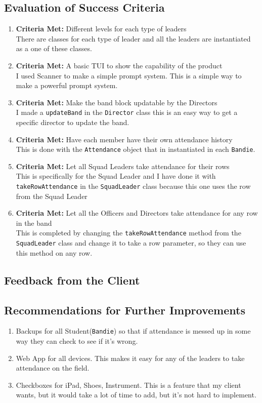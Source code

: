 \documentclass{article}
\begin{document}
\subsection{Evaluation of Success Criteria}
\begin{enumerate}
	\item \textbf{Criteria Met:} Different levels for each type of leaders \\
		There are classes for each type of leader and all the leaders are instantiated as a one of these classes.
	\item \textbf{Criteria Met:} A basic TUI to show the capability of the product\\
		I used Scanner to make a simple prompt system. This is a simple way to make a powerful prompt system.
	\item \textbf{Criteria Met:} Make the band block updatable by the Directors\\
		I made a \verb|updateBand| in the \verb|Director| class this is an easy way to get a specific director to update the band.
	\item \textbf{Criteria Met:} Have each member have their own attendance history\\
		This is done with the \verb|Attendance| object that in instantiated in each \verb|Bandie|.
	\item \textbf{Criteria Met:} Let all Squad Leaders take attendance for their rows\\
		This is specifically for the Squad Leader and I have done it with \verb|takeRowAttendance| in the \verb|SquadLeader| class because this one uses the row from the Squad Leader
	\item \textbf{Criteria Met:} Let all the Officers and Directors take attendance for any row in the band\\
		This is completed by changing the \verb|takeRowAttendance| method from the \verb|SquadLeader| class and change it to take a row parameter, so they can use this method on any row.
\end{enumerate}
\subsection{Feedback from the Client}
\subsection{Recommendations for Further Improvements}
\begin{enumerate}
	\item Backups for all Student(\verb|Bandie|) so that if attendance is messed up in some way they can check to see if it's wrong.
	\item Web App for all devices. This makes it easy for any of the leaders to take attendance on the field.
	\item Checkboxes for iPad, Shoes, Instrument. This is a feature that my client wants, but it would take a lot of time to add, but it's not hard to implement.
\end{enumerate}
\newpage
\end{document}
